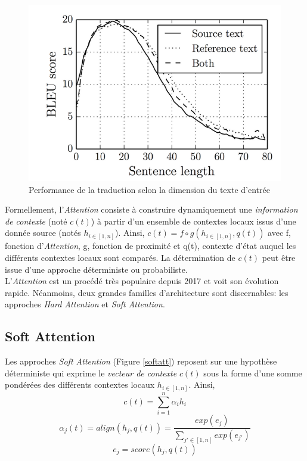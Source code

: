 \begin{figure}
    \centering
    \includegraphics[scale=0.3]{./tex/attention-deep-learning/curveatt.png}
    \caption{Performance de la traduction selon la dimension du texte d'entrée}
    \label{tradperf}
\end{figure}

\noindent Formellement, l'\textit{Attention} consiste à construire dynamiquement une \textit{information de contexte} (noté $c(t)$) à partir d'un ensemble de contextes locaux issus d'une donnée source (notés $h_{i \in [1,n]}$). Ainsi, $c(t)=f \circ g(h_{i \in [1,n]}, q(t))$ avec f, fonction d'\textit{Attention}, g, fonction de proximité et q(t), contexte d'état auquel les différents contextes locaux sont comparés. La détermination de $c(t)$ peut être issue d'une approche déterministe ou probabiliste.\\

\noindent L'\textit{Attention} est un procédé très populaire depuis 2017 et voit son évolution rapide. Néanmoins, deux grandes familles d'architecture sont discernables: les approches \textit{Hard Attention} et \textit{Soft Attention}.

\subsection{Soft Attention}
\label{softattention}
Les approches \textit{Soft Attention} (Figure \ref{softatt}) reposent sur une hypothèse déterministe qui exprime le \textit{vecteur de contexte} $c(t)$ sous la forme d'une somme pondérées des différents contextes locaux $h_{i \in [1,n]}$. Ainsi,
$$c(t)=\sum_{i=1}^n \alpha_i h_i$$
$$\alpha_j(t)=align(h_j,q(t))=\frac{exp(e_j)}{\sum_{j' \in [1,n]} exp(e_{j'})}$$
$$e_j=score(h_j,q(t))$$

